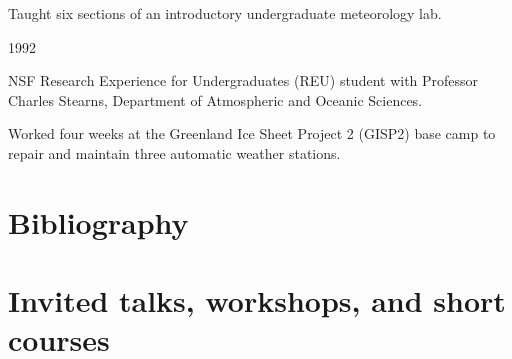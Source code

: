\documentclass[letterpaper]{resume}
\begin{document}
\begin{compactitem}[\itembullet]
  \item Taught six sections of an introductory undergraduate
    meteorology lab.
\end{compactitem}

 {1992}
\begin{compactitem}[\itembullet]
  \item NSF Research Experience for Undergraduates (REU) student with
    Professor Charles Stearns, Department of Atmospheric and Oceanic
    Sciences.
  \item Worked four weeks at the Greenland Ice Sheet Project 2 (GISP2)
    base camp to repair and maintain three automatic weather stations.
\end{compactitem}


\section{Bibliography}
\vspace{0.5em}

\nocite{*}




\section{Invited talks, workshops, and short courses}
\vspace{0.5em}
\end{document}
